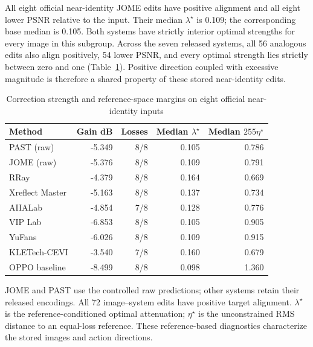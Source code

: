 \documentclass[12pt]{article}
\newcommand{\tabnote}[1]{\par\vspace{5pt}\noindent #1}
\begin{document}
All eight official near-identity JOME edits have positive alignment and all eight lower PSNR relative to the input. Their median $\lambda^\star$ is 0.109; the corresponding base median is 0.105. Both systems have strictly interior optimal strengths for every image in this subgroup. Across the seven released systems, all 56 analogous edits also align positively, 54 lower PSNR, and every optimal strength lies strictly between zero and one (Table~\ref{tab:geometry}). Positive direction coupled with excessive magnitude is therefore a shared property of these stored near-identity edits.
\begin{table}[t]
\caption{Correction strength and reference-space margins on eight official near-identity inputs}
\label{tab:geometry}
\begin{tabularx}{\linewidth}{@{}Xrrrr@{}}
\toprule
Method & Gain dB & Losses & Median $\lambda^\star$ & Median $255\eta^\star$\\
\midrule
PAST (raw) & -5.349 & 8/8 & 0.105 & 0.786 \\
JOME (raw) & -5.376 & 8/8 & 0.109 & 0.791 \\
RRay & -4.379 & 8/8 & 0.164 & 0.669 \\
Xreflect Master & -5.163 & 8/8 & 0.137 & 0.734 \\
AIIALab & -4.854 & 7/8 & 0.128 & 0.776 \\
VIP Lab & -6.853 & 8/8 & 0.105 & 0.905 \\
YuFans & -6.026 & 8/8 & 0.109 & 0.915 \\
KLETech-CEVI & -3.540 & 7/8 & 0.160 & 0.679 \\
OPPO baseline & -8.499 & 8/8 & 0.098 & 1.360 \\
\bottomrule
\end{tabularx}
\tabnote{JOME and PAST use the controlled raw predictions; other systems retain their released encodings. All 72 image--system edits have positive target alignment. $\lambda^\star$ is the reference-conditioned optimal attenuation; $\eta^\star$ is the unconstrained RMS distance to an equal-loss reference. These reference-based diagnostics characterize the stored images and action directions.}
\end{table}
\end{document}
